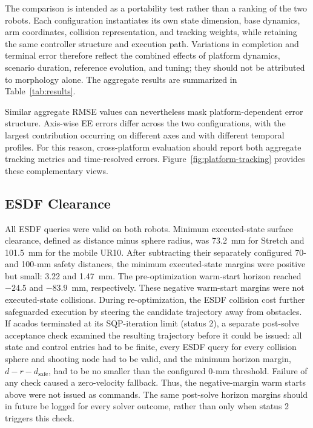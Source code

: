\documentclass[conference]{IEEEtran}
\begin{document}
The comparison is intended as a portability test rather than a ranking of the
two robots.  Each configuration instantiates its own state dimension, base
dynamics, arm coordinates, collision representation, and tracking weights,
while retaining the same controller structure and execution path.  Variations
in completion and terminal error therefore reflect the combined effects of
platform dynamics, scenario duration, reference evolution, and tuning; they
should not be attributed to morphology alone.  The aggregate results are
summarized in Table~\ref{tab:results}.

Similar aggregate RMSE values can nevertheless mask platform-dependent error
structure.  Axis-wise EE errors differ across the two configurations, with the
largest contribution occurring on different axes and with different temporal
profiles.  For this reason, cross-platform evaluation should report both
aggregate tracking metrics and time-resolved errors.
Figure~\ref{fig:platform-tracking} provides these complementary views.

\subsection{ESDF Clearance}

All ESDF queries were valid on both robots.  Minimum executed-state surface clearance,
defined as distance minus sphere radius, was 73.2~mm for Stretch and 101.5~mm
for the mobile UR10.  After subtracting their separately configured 70- and
100-mm safety distances, the minimum executed-state margins were positive but
small: 3.22 and 1.47~mm.  The pre-optimization warm-start horizon reached
$-24.5$ and $-83.9$~mm, respectively.  These negative warm-start margins were
not executed-state collisions.  During re-optimization, the ESDF collision
cost further safeguarded execution by steering the candidate trajectory away
from obstacles.  If acados terminated at its SQP-iteration limit (status 2), a
separate post-solve acceptance check examined the resulting trajectory before
it could be issued: all state and control entries had to be finite, every ESDF
query for every collision sphere and shooting node had to be valid, and the
minimum horizon margin, $d-r-d_{\mathrm{safe}}$, had to be no smaller than the
configured 0-mm threshold.  Failure of any check caused a zero-velocity
fallback.  Thus, the negative-margin warm starts above were not issued as
commands.  The same post-solve horizon margins should in future be logged for
every solver outcome, rather than only when status 2 triggers this check.
\end{document}
